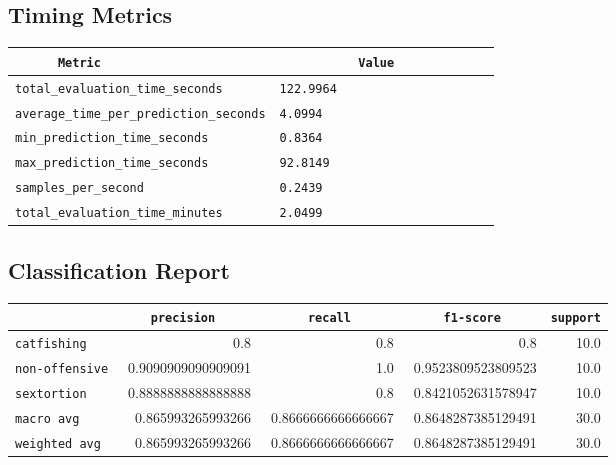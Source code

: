 \documentclass{article}
\begin{document}
\subsection{Timing Metrics}

\begin{center}
\begin{tabular}{l | l} \hline
    \verb|      Metric     | & \verb|           Value           | \\ \hline
    \hline
    \verb|total_evaluation_time_seconds| & \verb|122.9964                     | \\ \hline
    \verb|average_time_per_prediction_seconds| & \verb|4.0994                       | \\ \hline
    \verb|min_prediction_time_seconds| & \verb|0.8364                       | \\ \hline
    \verb|max_prediction_time_seconds| & \verb|92.8149                      | \\ \hline
    \verb|samples_per_second| & \verb|0.2439                       | \\ \hline
    \verb|total_evaluation_time_minutes| & \verb|2.0499                       | \\ \hline
\end{tabular}
\end{center}

\subsection{Classification Report}

\begin{center}
\begin{tabular}{l | r | r | r | r} \hline
    \verb|            | & \verb|    precision     | & \verb|      recall      | & \verb|     f1-score     | & \verb|support| \\ \hline
    \hline
    \verb|catfishing | & 0.8 & 0.8 & 0.8 &    10.0 \\ \hline
    \verb|non-offensive| & 0.9090909090909091 & 1.0 & 0.9523809523809523 &    10.0 \\ \hline
    \verb|sextortion | & 0.8888888888888888 & 0.8 & 0.8421052631578947 &    10.0 \\ \hline
    \verb|macro avg  | & 0.865993265993266 & 0.8666666666666667 & 0.8648287385129491 &    30.0 \\ \hline
    \verb|weighted avg| & 0.865993265993266 & 0.8666666666666667 & 0.8648287385129491 &    30.0 \\ \hline
\end{tabular}
\end{center}
\end{document}
